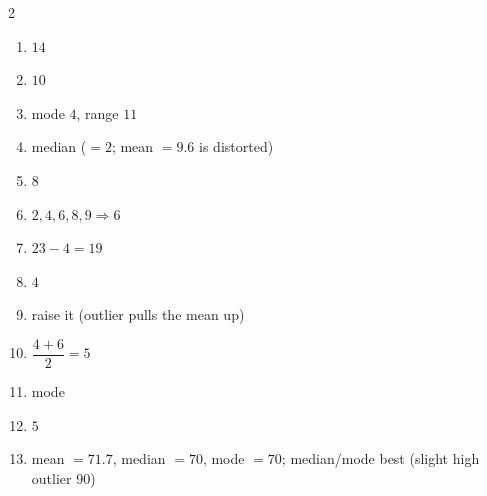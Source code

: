 \documentclass[11pt]{article}
\begin{document}
\begin{keybox}
\begin{multicols}{2}
\small
\begin{enumerate}[leftmargin=*,itemsep=3pt]
  \item $14$
  \item $10$
  \item mode $4$, range $11$
  \item median ($=2$; mean $=9.6$ is distorted)
  \item $8$
  \item $2,4,6,8,9\Rightarrow6$
  \item $23-4=19$
  \item $4$
  \item raise it (outlier pulls the mean up)
  \item $\dfrac{4+6}{2}=5$
  \item mode
  \item $5$
  \item mean $=71.7$, median $=70$, mode $=70$; median/mode best (slight high outlier 90)
\end{enumerate}
\end{multicols}
\end{keybox}
\end{document}
